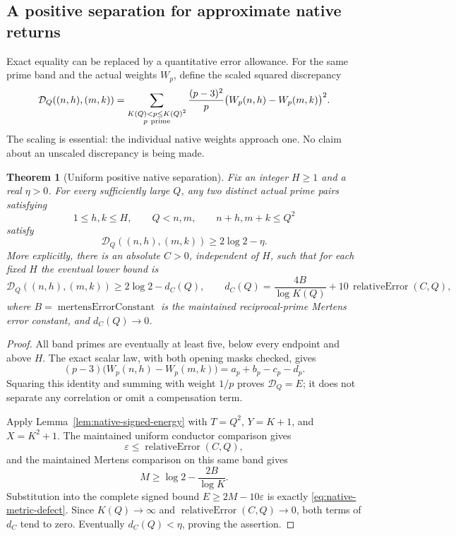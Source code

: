 \documentclass[11pt]{article}
\newtheorem{theorem}{Theorem}[section]
\begin{document}
\subsection{A positive separation for approximate native returns}
\label{sec:native-metric-return}

Exact equality can be replaced by a quantitative error allowance.
For the same prime band and the actual weights \(W_p\), define the
scaled squared discrepancy
\[
 \mathcal D_Q((n,h),(m,k))
   =\sum_{\substack{K(Q)<p\le K(Q)^2\\p\ {\rm prime}}}
       \frac{(p-3)^2}{p}
           \bigl(W_p(n,h)-W_p(m,k)\bigr)^2.
\]
The scaling is essential: the individual native weights approach one.
No claim about an unscaled discrepancy is being made.

\begin{theorem}[Uniform positive native separation]
\label{thm:native-metric-separation}
Fix an integer \(H\ge1\) and a real \(\eta>0\).
For every sufficiently large \(Q\), any two distinct actual prime pairs
satisfying
\[
 1\le h,k\le H,\qquad Q<n,m,\qquad n+h,m+k\le Q^2
\]
satisfy
\[
             \mathcal D_Q((n,h),(m,k))\ge2\log2-\eta.
\]
More explicitly, there is an absolute \(C>0\), independent of \(H\),
such that for each fixed \(H\) the eventual lower bound is
\begin{equation}\label{eq:native-metric-defect}
 \mathcal D_Q((n,h),(m,k))
       \ge2\log2-d_C(Q),\qquad
 d_C(Q)=\frac{4B}{\log K(Q)}
                  +10\,\operatorname{relativeError}(C,Q),
\end{equation}
where \(B=\operatorname{mertensErrorConstant}\) is the maintained
reciprocal-prime Mertens error constant, and \(d_C(Q)\to0\).
\end{theorem}

\begin{proof}
All band primes are eventually at least five, below every endpoint and
above \(H\). The exact scalar law, with both opening masks checked, gives
\[
 (p-3)\bigl(W_p(n,h)-W_p(m,k)\bigr)
                      =a_p+b_p-c_p-d_p.
\]
Squaring this identity and summing with weight \(1/p\) proves
\(\mathcal D_Q=E\); it does not separate any correlation or omit
a compensation term.

Apply Lemma~\ref{lem:native-signed-energy} with
\(T=Q^2\), \(Y=K+1\), and \(X=K^2+1\).
The maintained uniform conductor comparison gives
\[
 \varepsilon\le\operatorname{relativeError}(C,Q),
\]
and the maintained Mertens comparison on this same band gives
\[
                    M\ge\log2-\frac{2B}{\log K}.
\]
Substitution into the complete signed bound \(E\ge2M-10\varepsilon\)
is exactly \eqref{eq:native-metric-defect}.
Since \(K(Q)\to\infty\) and
\(\operatorname{relativeError}(C,Q)\to0\), both terms of \(d_C\)
tend to zero. Eventually \(d_C(Q)<\eta\), proving the assertion.
\end{proof}
\end{document}
